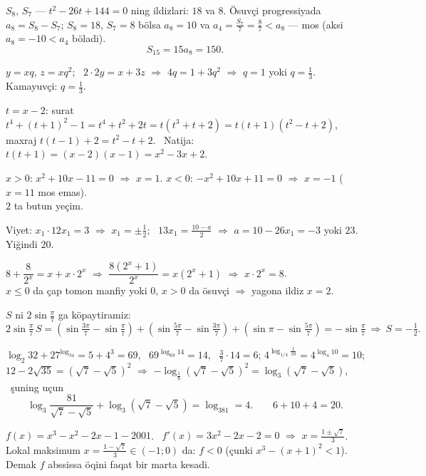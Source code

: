 $S_8$, $S_7$ — $t^2-26t+144=0$ ning ildizlari: $18$ va $8$. Ösuvçi progressiyada $a_8=S_8-S_7$; $S_8=18$, $S_7=8$ bölsa $a_8=10$ va $a_4=\frac{S_7}7=\frac87<a_8$ — mos (aksi $a_8=-10<a_4$ böladi).
\[S_{15}=15a_8=150.\]

$y=xq$, $z=xq^2$; \ $2\cdot2y=x+3z$ $\Rightarrow$ $4q=1+3q^2$ $\Rightarrow$ $q=1$ yoki $q=\frac13$. Kamayuvçi: $q=\frac13$.

$t=x-2$: surat $t^4+(t+1)^2-1=t^4+t^2+2t=t(t^3+t+2)=t(t+1)(t^2-t+2)$,\\
maxraj $t(t-1)+2=t^2-t+2$. \ Natija: $t(t+1)=(x-2)(x-1)=x^2-3x+2$.

$x>0$: $x^2+10x-11=0$ $\Rightarrow$ $x=1$. \quad $x<0$: $-x^2+10x+11=0$ $\Rightarrow$ $x=-1$ ($x=11$ mos emas).\\
$2$ ta butun yeçim.

Viyet: $x_1\cdot12x_1=3$ $\Rightarrow$ $x_1=\pm\frac12$; \ $13x_1=\frac{10-a}2$ $\Rightarrow$ $a=10-26x_1=-3$ yoki $23$. Yiğindi $20$.

$8+\dfrac8{2^x}=x+x\cdot2^x$ $\Rightarrow$ $\dfrac{8(2^x+1)}{2^x}=x(2^x+1)$ $\Rightarrow$ $x\cdot2^x=8$.\\
$x\le0$ da çap tomon manfiy yoki $0$, $x>0$ da ösuvçi $\Rightarrow$ yagona ildiz $x=2$.

$S$ ni $2\sin\frac\pi7$ ga köpaytiramiz:
\[2\sin\tfrac\pi7\,S=\left(\sin\tfrac{3\pi}7-\sin\tfrac\pi7\right)+\left(\sin\tfrac{5\pi}7-\sin\tfrac{3\pi}7\right)+\left(\sin\pi-\sin\tfrac{5\pi}7\right)=-\sin\tfrac\pi7\ \Rightarrow\ S=-\tfrac12.\]

$\log_2 32+27^{\log_34}=5+4^3=69$, \ $69^{\log_{69}14}=14$, \ $\frac37\cdot14=6$; \quad $4^{\log_{1/4}\frac1{10}}=4^{\log_4 10}=10$;\\
$12-2\sqrt{35}=(\sqrt7-\sqrt5)^2$ $\Rightarrow$ $-\log_{\frac19}(\sqrt7-\sqrt5)^2=\log_3(\sqrt7-\sqrt5)$, \ şuning uçun
\[\log_3\frac{81}{\sqrt7-\sqrt5}+\log_3(\sqrt7-\sqrt5)=\log_381=4.\qquad 6+10+4=20.\]

$f(x)=x^3-x^2-2x-1-2001$. \ $f'(x)=3x^2-2x-2=0$ $\Rightarrow$ $x=\frac{1\pm\sqrt7}3$. Lokal maksimum $x=\frac{1-\sqrt7}3\in(-1;0)$ da: $f<0$ (çunki $x^3-(x+1)^2<1$). Demak $f$ abssissa öqini faqat bir marta kesadi.

